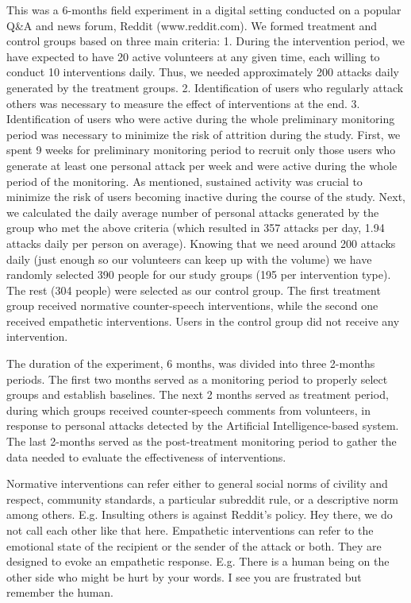 \documentclass[
  10pt,
  dvipsnames,enabledeprecatedfontcommands]{scrartcl}
\begin{document}
This was a 6-months field experiment in a digital setting conducted on a
popular Q\&A and news forum, Reddit (www.reddit.com). We formed
treatment and control groups based on three main criteria: 1. During the
intervention period, we have expected to have 20 active volunteers at
any given time, each willing to conduct 10 interventions daily. Thus, we
needed approximately 200 attacks daily generated by the treatment
groups. 2. Identification of users who regularly attack others was
necessary to measure the effect of interventions at the end. 3.
Identification of users who were active during the whole preliminary
monitoring period was necessary to minimize the risk of attrition during
the study. First, we spent 9 weeks for preliminary monitoring period to
recruit only those users who generate at least one personal attack per
week and were active during the whole period of the monitoring. As
mentioned, sustained activity was crucial to minimize the risk of users
becoming inactive during the course of the study. Next, we calculated
the daily average number of personal attacks generated by the group who
met the above criteria (which resulted in 357 attacks per day, 1.94
attacks daily per person on average). Knowing that we need around 200
attacks daily (just enough so our volunteers can keep up with the
volume) we have randomly selected 390 people for our study groups (195
per intervention type). The rest (304 people) were selected as our
control group. The first treatment group received normative
counter-speech interventions, while the second one received empathetic
interventions. Users in the control group did not receive any
intervention.

The duration of the experiment, 6 months, was divided into three
2-months periods. The first two months served as a monitoring period to
properly select groups and establish baselines. The next 2 months served
as treatment period, during which groups received counter-speech
comments from volunteers, in response to personal attacks detected by
the Artificial Intelligence-based system. The last 2-months served as
the post-treatment monitoring period to gather the data needed to
evaluate the effectiveness of interventions.

Normative interventions can refer either to general social norms of
civility and respect, community standards, a particular subreddit rule,
or a descriptive norm among others. E.g. Insulting others is against
Reddit's policy. Hey there, we do not call each other like that here.
Empathetic interventions can refer to the emotional state of the
recipient or the sender of the attack or both. They are designed to
evoke an empathetic response. E.g. There is a human being on the other
side who might be hurt by your words. I see you are frustrated but
remember the human.
\end{document}
